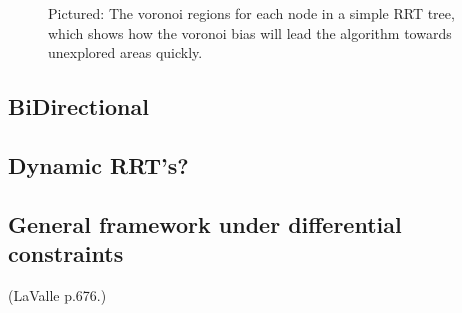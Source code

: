 \begin{figure}
  \label{fig:rrt-voronoi}
  \caption{Pictured: The voronoi regions for each node in a simple RRT tree,
    which shows how the voronoi bias will lead the algorithm towards unexplored
    areas quickly.}
\end{figure}

\subsection{BiDirectional}
\subsection{Dynamic RRT's?}

\begin{figure}
  
\end{figure}

\subsection{General framework under differential constraints} (LaValle p.676.)


